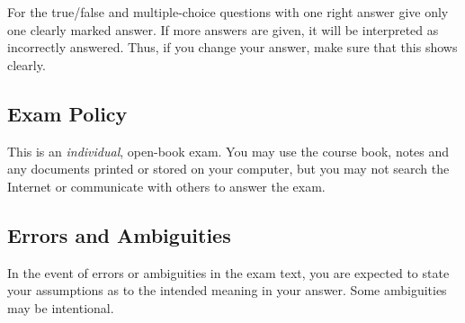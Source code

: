 For the true/false and multiple-choice questions with one right answer give only one clearly marked answer. If more answers are given, it will be interpreted as incorrectly answered. Thus, if you change your answer, make sure that this shows clearly.


\subsection*{Exam Policy}
This is an \emph{individual}, open-book exam.
You may use the course book, notes and any documents printed or stored on your computer, but you may not search the Internet or communicate with others to answer the exam.

\subsection*{Errors and Ambiguities}

In the event of errors or ambiguities in the exam text, you are expected to
state your assumptions as to the intended meaning in your answer.
%
Some ambiguities may be intentional.


